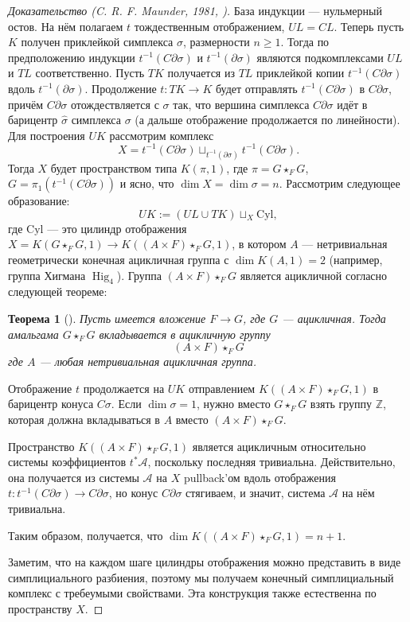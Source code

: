 \documentclass[14pt, dvipsnames, twoside]{extarticle}
\newtheorem{theorem}{Теорема}
\theoremstyle{definition}
\theoremstyle{remark}
\DeclareMathOperator{\Hig}{\mathrm{Hig}}
\begin{document}
\begin{proof}[Доказательство {\normalfont (C. R. F. Maunder, 1981, \cite{Maunder})}]
База индукции --- нульмерный остов. На нём полагаем $t$ тождественным отображением, $UL = CL$. Теперь пусть $K$ получен приклейкой симплекса $\sigma$, размерности $n\geqslant 1$. Тогда по предположению индукции $t^{-1}(C\partial\sigma)$ и $t^{-1}(\partial\sigma)$ являются подкомплексами $UL$ и $TL$ соответственно. Пусть $TK$ получается из $TL$ приклейкой копии $t^{-1}(C\partial \sigma)$ вдоль $t^{-1}(\partial\sigma)$. Продолжение $t: TK\to K$ будет отправлять $t^{-1}(C\partial \sigma)$ в $C\partial\sigma$, причём $C\partial\sigma$ отождествляется с $\sigma$ так, что вершина симплекса $C\partial\sigma$ идёт в барицентр $\hat{\sigma}$ симплекса $\sigma$ (а дальше отображение продолжается по линейности). Для построения $UK$ рассмотрим комплекс $$X = t^{-1}(C\partial\sigma)\sqcup_{t^{-1}(\partial\sigma)}t^{-1}(C\partial\sigma).$$ Тогда $X$ будет пространством типа $K(\pi, 1)$, где $\pi = G\star_F G$, $G = \pi_1(t^{-1}(C\partial\sigma))$ и ясно, что $\dim X = \dim \sigma = n$. Рассмотрим следующее образование: $$UK := (UL\cup TK)\sqcup_X \mathrm{Cyl},$$ где $\mathrm{Cyl}$ --- это цилиндр отображения $X = K(G\star_F G, 1)\to K((A\times F)\star_F G, 1)$, в котором $A$ --- нетривиальная геометрически конечная ацикличная группа с $\dim K(A, 1) = 2$ (например, группа Хигмана $\Hig_4$). Группа $(A\times F)\star_F G$ является ацикличной согласно следующей теореме:

\begin{theorem}[\cite{BDH}]\label{theorem_from_BDH}
Пусть имеется вложение $F\to G$, где $G$ --- ацикличная. Тогда амальгама $G\star_F G$ вкладывается в ацикличную группу $$(A\times F)\star_F G$$ где $A$ --- любая нетривиальная ацикличная группа.
\end{theorem}

 Отображение $t$ продолжается на $UK$ отправлением $K((A\times F)\star_F G, 1)$ в барицентр конуса $C\sigma$. Если $\dim\sigma = 1$, нужно вместо $G\star_F G$ взять группу $\mathbb{Z}$, которая должна вкладываться в $A$ вместо $(A\times F)\star_F G$.

Пространство $K((A\times F)\star_FG, 1)$ является ацикличным относительно системы коэффициентов $t^\ast\mathcal{A}$, поскольку последняя тривиальна. Действительно, она получается из системы $\mathcal{A}$ на $X$ pullback'ом вдоль отображения $t: t^{-1}(C\partial\sigma)\to C\partial\sigma$, но конус $C\partial\sigma$ стягиваем, и значит, система $\mathcal{A}$ на нём тривиальна. 

Таким образом, получается, что $\dim K((A\times F)\star_FG, 1) = n + 1$.   

Заметим, что на каждом шаге цилиндры отображения можно представить в виде симплициального разбиения, поэтому мы получаем конечный симплициальный комплекс с требеумыми свойствами. Эта конструкция также естественна по пространству $X$.  


\end{proof}
\end{document}
